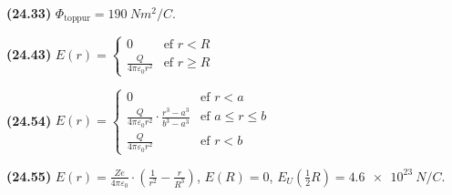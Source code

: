 \ifdefined \wholebook \else\documentclass[oneside]{book}\usepackage{EdlBook}\graphicspath{{figures/}}
\begin{document}
\begin{tcolorbox}
\begin{enumerate*}[label = \vspace{0.15cm} ]
  \item \textbf{(24.33)} $\Phi_{\text{toppur}} = \SI{190}{Nm^2/C}$.
  \item \textbf{(24.43)} $\displaystyle E(r) = \begin{cases} 0 & \text{ef $r<R$} \\[0.5pt] \frac{Q}{4\pi \varepsilon_0 r^2} & \text{ef $r \geq R$} \end{cases}$
  \item \textbf{(24.54)} $\displaystyle E(r) = \begin{cases} 0 & \text{ef $r < a$} \\[0.75pt] \frac{Q}{4\pi \varepsilon_0 r^2} \cdot \frac{r^3-a^3}{b^3-a^3} & \text{ef $a \leq r \leq b$} \\[0.75pt] \frac{Q}{4\pi \varepsilon_0 r^2} & \text{ef $r < b$} \end{cases}$
  \item \textbf{(24.55)} $E(r) = \frac{Ze}{4\pi \varepsilon_0} \cdot \left( \frac{1}{r^2} - \frac{r}{R^3} \right)$, $E(R) = 0$, $E_U(\frac{1}{2}R) = \SI{4.6e23}{N/C}$.
\end{enumerate*}
\end{tcolorbox}


\newpage




\ifdefined \wholebook \else
 \printindex
\end{document}
